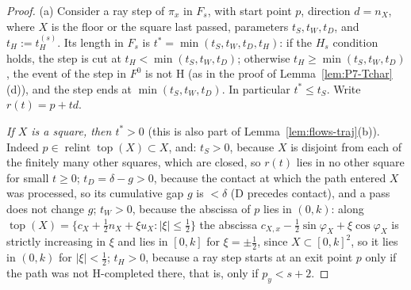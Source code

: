 \documentclass[11pt]{amsart}
\newcommand{\relint}{\operatorname{relint}}
\newcommand{\Top}{\operatorname{top}}
\newcommand{\Fz}{F^{0}}
\newcommand{\Fs}{F_{s}}
\theoremstyle{definition}
\theoremstyle{remark}
\numberwithin{equation}{section}
\begin{document}
\begin{proof}
(a) Consider a ray step of $\pi_x$ in $\Fs$, with start point $p$, direction $d=n_X$, where $X$ is the floor or the square last passed, parameters $t_S,t_W,t_D$, and $t_H:=t_H^{(s)}$. Its length in $\Fs$ is $t^*=\min(t_S,t_W,t_D,t_H)$: if the $H_s$ condition holds, the step is cut at $t_H<\min(t_S,t_W,t_D)$; otherwise $t_H\ge\min(t_S,t_W,t_D)$, the event of the step in $\Fz$ is not H (as in the proof of Lemma~\ref{lem:P7-Tchar}(d)), and the step ends at $\min(t_S,t_W,t_D)$. In particular $t^*\le t_S$. Write $r(t)=p+td$.

\emph{If $X$ is a square, then $t^*>0$} (this is also part of Lemma~\ref{lem:flows-traj}(b)). Indeed $p\in\relint\Top(X)\subset X$, and:
$t_S>0$, because $X$ is disjoint from each of the finitely many other squares, which are closed, so $r(t)$ lies in no other square for small $t\ge0$;
$t_D=\delta-g>0$, because the contact at which the path entered $X$ was processed, so its cumulative gap $g$ is $<\delta$ (D precedes contact), and a pass does not change $g$;
$t_W>0$, because the abscissa of $p$ lies in $(0,k)$: along $\Top(X)=\{c_X+\frac12n_X+\xi u_X:|\xi|\le\frac12\}$ the abscissa $c_{X,x}-\frac12\sin\varphi_X+\xi\cos\varphi_X$ is strictly increasing in $\xi$ and lies in $[0,k]$ for $\xi=\pm\frac12$, since $X\subset[0,k]^2$, so it lies in $(0,k)$ for $|\xi|<\frac12$;
$t_H>0$, because a ray step starts at an exit point $p$ only if the path was not H-completed there, that is, only if $p_y<s+2$.


\end{proof}
\end{document}

